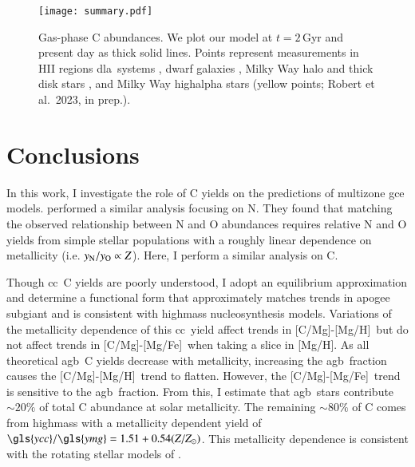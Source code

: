 \documentclass[12pt,oneside,letterpaper]{report}
\newcommand{\cc}{\gls{cc}}
\newcommand{\agb}{\gls{agb}}
\newcommand{\dla}{\gls{dla}}
\newcommand{\gce}{\gls{gce}}
\newcommand{\apogee}{\gls{apogee}}
\newcommand{\Ycc}{\gls{ycc}}
\newcommand{\Yoc}{\gls{ymg}}
\newcommand{\caah}{[C/Mg]-[Mg/H]}
\newcommand{\caafe}{[C/Mg]-[Mg/Fe]}
\newcommand{\citealtjack}{Robert et al.~2023, in prep.}
\newcommand{\about}[1]{${\sim} #1$}
\begin{document}
\begin{figure}[htp]
\centering
\texttt{[image: summary.pdf]}
\caption[Gas phase abundances]{Gas-phase C abundances. We plot our model at $t=2$\,Gyr and present day as thick solid lines. Points represent measurements in 
    HII regions    \citep[pink circles;][]{skillman+20, esteban+02, esteban+09, esteban+14, esteban+19}
    \dla\ systems \citep[blue triangles;][]{ellison+10, srianand+10, dutta+14, DZ+03, pettini+08, morrison+16,cooke+17},  %
    dwarf galaxies \citep[red diamonds;][]{berg+19},
    Milky Way halo and thick disk stars \citep[green stars;][]{nissen+14, fabbian+09},
    and Milky Way \gls{highalpha} stars (yellow points; \citealtjack).
}
\label{fig:gas_phase}
\end{figure}


\chapter{Conclusions}

In this work, I investigate the role of C yields on the predictions of \gls{multizone} \gce{} models. \citet{james+23} performed a similar analysis focusing on N. They found that matching the observed relationship between N and O abundances \citep{HEK00,PVT10,berg+12, berg+20, skillman+20, izotov+12, james2+15, dopita+16} requires relative N and O yields from simple stellar populations with a roughly linear dependence on metallicity (i.e. $y_{\rm N}/y_{\rm O} \propto Z$). 
Here, I perform a similar analysis on C. 

Though \cc\ C yields are poorly understood, I adopt an equilibrium approximation and determine a functional form that approximately matches trends in \apogee{} \gls{subgiant} and is consistent with \gls{highmass} \gls{nucleosynthesis} models. Variations of the metallicity dependence of this \cc\ yield affect trends in \caah~but do not affect trends in \caafe\ when taking a slice in [Mg/H]. As all theoretical \agb\ C yields decrease with metallicity, increasing the \agb\ fraction causes the \caah\ trend to flatten. However, the \caafe\ trend is sensitive to the \agb\ fraction. 
From this, I estimate that \agb\ stars contribute \about{20\%} of total C abundance at solar metallicity. The remaining \about{80\%} of C comes from \gls{highmass} with a metallicity dependent yield of $\Ycc/\Yoc=1.51 + 0.54 (Z/Z_\odot)$. 
This metallicity dependence is consistent with the rotating stellar models of \citet{LC18}. 
 
\end{document}
